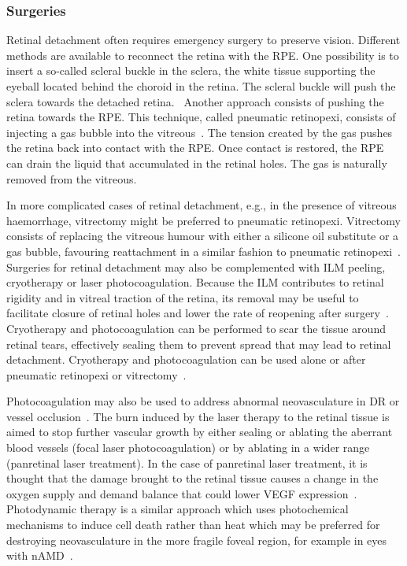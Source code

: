 \documentclass{article}
\begin{document}
\subsubsection{Surgeries}

Retinal detachment often requires emergency surgery to preserve vision.
Different methods are available to reconnect the retina with the RPE.
One possibility is to insert a so-called scleral buckle in the sclera, the white tissue supporting the eyeball located behind the choroid in the retina.
The scleral buckle will push the sclera towards the detached retina.~\cite{Sodhi_2008}
Another approach consists of pushing the retina towards the RPE.
This technique, called pneumatic retinopexi, consists of injecting a gas bubble into the vitreous~\cite{Sodhi_2008}.
The tension created by the gas pushes the retina back into contact with the RPE.
Once contact is restored, the RPE can drain the liquid that accumulated in the retinal holes.
The gas is naturally removed from the vitreous.

In more complicated cases of retinal detachment, e.g., in the presence of vitreous haemorrhage, vitrectomy might be preferred to pneumatic retinopexi.
Vitrectomy consists of replacing the vitreous humour with either a silicone oil substitute or a gas bubble, favouring reattachment in a similar fashion to pneumatic retinopexi~\cite{Dervenis_2022}.
Surgeries for retinal detachment may also be complemented with ILM peeling, cryotherapy or laser photocoagulation.
Because the ILM contributes to retinal rigidity and in vitreal traction of the retina, its removal may be useful to facilitate closure of retinal holes and lower the rate of reopening after surgery~\cite{Chatziralli_2018}.
Cryotherapy and photocoagulation can be performed to scar the tissue around retinal tears, effectively sealing them to prevent spread that may lead to retinal detachment.
Cryotherapy and photocoagulation can be used alone or after pneumatic retinopexi or vitrectomy~\cite{Sodhi_2008}.

Photocoagulation may also be used to address abnormal neovasculature in DR or vessel occlusion~\cite{Evans_2014}.
The burn induced by the laser therapy to the retinal tissue is aimed to stop further vascular growth by either sealing or ablating the aberrant blood vessels (focal laser photocoagulation) or by ablating in a wider range (panretinal laser treatment).
In the case of panretinal laser treatment, it is thought that the damage brought to the retinal tissue causes a change in the oxygen supply and demand balance that could lower VEGF expression~\cite{Evans_2014}.
Photodynamic therapy is a similar approach which uses photochemical mechanisms to induce cell death rather than heat which may be preferred for destroying neovasculature in the more fragile foveal region, for example in eyes with nAMD~\cite{SchmidtErfurth_2000}.
\end{document}
